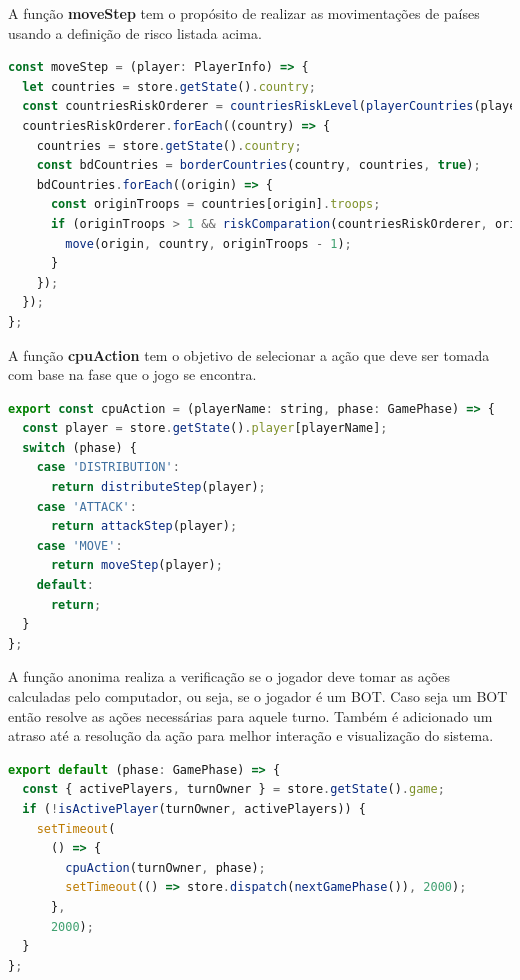 \documentclass[rel_mlp]{iiufrgs}
\begin{document}
A função \textbf{moveStep} tem o propósito de realizar as movimentações de países usando a definição de risco listada acima.
\begin{lstlisting}[language=JavaScript]
const moveStep = (player: PlayerInfo) => {
  let countries = store.getState().country;
  const countriesRiskOrderer = countriesRiskLevel(playerCountries(player.name, countries));
  countriesRiskOrderer.forEach((country) => {
    countries = store.getState().country;
    const bdCountries = borderCountries(country, countries, true);
    bdCountries.forEach((origin) => {
      const originTroops = countries[origin].troops;
      if (originTroops > 1 && riskComparation(countriesRiskOrderer, origin, country)) {
        move(origin, country, originTroops - 1);
      }
    });
  });
};
\end{lstlisting}

A função \textbf{cpuAction} tem o objetivo de selecionar a ação que deve ser tomada com base na fase que o jogo se encontra.
\begin{lstlisting}[language=JavaScript]
export const cpuAction = (playerName: string, phase: GamePhase) => {
  const player = store.getState().player[playerName];
  switch (phase) {
    case 'DISTRIBUTION':
      return distributeStep(player);
    case 'ATTACK':
      return attackStep(player);
    case 'MOVE':
      return moveStep(player);
    default:
      return;
  }
};
\end{lstlisting}

A função anonima realiza a verificação se o jogador deve tomar as ações calculadas pelo computador, ou seja, se o jogador é um BOT.
Caso seja um BOT então resolve as ações necessárias para aquele turno.
Também é adicionado um atraso até a resolução da ação para melhor interação e visualização do sistema.
\begin{lstlisting}[language=JavaScript]
export default (phase: GamePhase) => {
  const { activePlayers, turnOwner } = store.getState().game;
  if (!isActivePlayer(turnOwner, activePlayers)) {
    setTimeout(
      () => {
        cpuAction(turnOwner, phase);
        setTimeout(() => store.dispatch(nextGamePhase()), 2000);
      },
      2000);
  }
};

\end{lstlisting}
\end{document}
